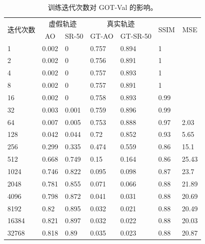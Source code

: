 \begin{table}[t!]
\centering
\caption{训练迭代次数对 GOT-Val 的影响。}
\begin{tabular}{@{}lllllll@{}}
\toprule
\multirow{2}{*}{迭代次数} & \multicolumn{2}{c}{虚假轨迹} & \multicolumn{2}{c}{真实轨迹} & \multirow{2}{*}{SSIM} & \multicolumn{1}{c}{\multirow{2}{*}{MSE}} \\ \cmidrule(lr){2-3} \cmidrule(lr){4-5}
 & \multicolumn{1}{c}{AO} & \multicolumn{1}{c}{SR-50} & \multicolumn{1}{c}{GT-AO} & \multicolumn{1}{c}{GT-SR-50} &  & \multicolumn{1}{c}{} \\ \midrule
1 & 0.002 & 0 & 0.757 & 0.894 & 1 &  \\
2 & 0.002 & 0 & 0.756 & 0.891 & 1 &  \\
4 & 0.002 & 0 & 0.757 & 0.893 & 1 &  \\
8 & 0.002 & 0 & 0.757 & 0.891 & 1 &  \\
16 & 0.002 & 0 & 0.758 & 0.893 & 0.99 &  \\
32 & 0.003 & 0.001 & 0.759 & 0.896 & 0.99 &  \\
64 & 0.007 & 0.005 & 0.753 & 0.888 & 0.97 & 2.03 \\
128 & 0.042 & 0.044 & 0.72 & 0.852 & 0.93 & 5.65 \\
256 & 0.299 & 0.335 & 0.474 & 0.559 & 0.86 & 15.1 \\
512 & 0.668 & 0.749 & 0.15 & 0.164 & 0.86 & 25.43 \\
1024 & 0.746 & 0.822 & 0.095 & 0.098 & 0.87 & 23.7 \\
2048 & 0.781 & 0.855 & 0.071 & 0.066 & 0.88 & 21.89 \\
4096 & 0.798 & 0.872 & 0.041 & 0.031 & 0.88 & 20.69 \\
8192 & 0.82 & 0.895 & 0.032 & 0.021 & 0.88 & 20.49 \\
16384 & 0.821 & 0.897 & 0.032 & 0.022 & 0.88 & 20.03 \\
32768 & 0.818 & 0.89 & 0.035 & 0.023 & 0.88 & 20.87 \\ \bottomrule
\end{tabular}
\label{tab:attack_iter}
\end{table}

